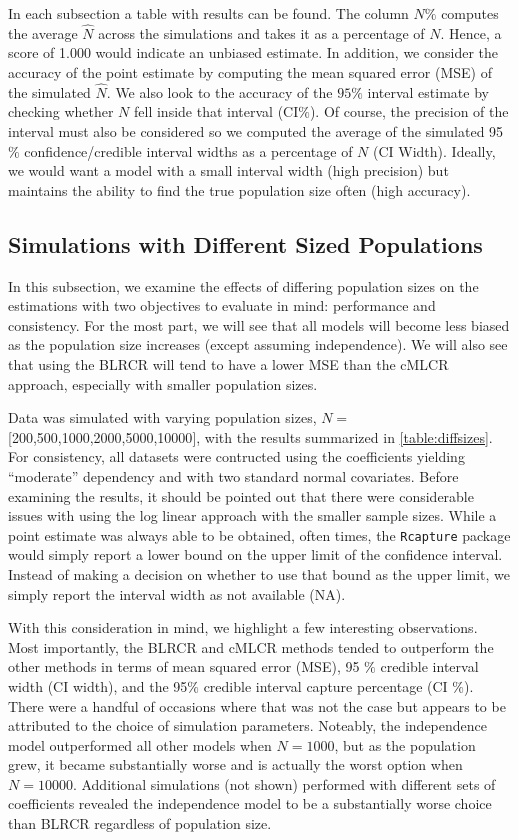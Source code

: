 \documentclass[
  12pt,
]{article}
\begin{document}
In each subsection a table with results can be found. The column \(N\%\)
computes the average \(\hat{N}\) across the simulations and takes it as
a percentage of \(N\). Hence, a score of 1.000 would indicate an
unbiased estimate. In addition, we consider the accuracy of the point
estimate by computing the mean squared error (MSE) of the simulated
\(\hat{N}\). We also look to the accuracy of the \(95\%\) interval
estimate by checking whether \(N\) fell inside that interval (CI\(\%\)).
Of course, the precision of the interval must also be considered so we
computed the average of the simulated 95\(\%\) confidence/credible
interval widths as a percentage of \(N\) (CI Width). Ideally, we would
want a model with a small interval width (high precision) but maintains
the ability to find the true population size often (high accuracy).

\subsection{Simulations with Different Sized Populations}
\label{Sec:simspopsize}

In this subsection, we examine the effects of differing population sizes
on the estimations with two objectives to evaluate in mind: performance
and consistency. For the most part, we will see that all models will
become less biased as the population size increases (except assuming
independence). We will also see that using the BLRCR will tend to have a
lower MSE than the cMLCR approach, especially with smaller population
sizes.

Data was simulated with varying population sizes,
\(N=\){[}200,500,1000,2000,5000,10000{]}, with the results summarized in
\autoref{table:diffsizes}. For consistency, all datasets were contructed
using the coefficients yielding ``moderate'' dependency and with two
standard normal covariates. Before examining the results, it should be
pointed out that there were considerable issues with using the log
linear approach with the smaller sample sizes. While a point estimate
was always able to be obtained, often times, the \texttt{Rcapture}
package would simply report a lower bound on the upper limit of the
confidence interval. Instead of making a decision on whether to use that
bound as the upper limit, we simply report the interval width as not
available (NA).

With this consideration in mind, we highlight a few interesting
observations. Most importantly, the BLRCR and cMLCR methods tended to
outperform the other methods in terms of mean squared error (MSE), 95
\(\%\) credible interval width (CI width), and the 95\(\%\) credible
interval capture percentage (CI \(\%\)). There were a handful of
occasions where that was not the case but appears to be attributed to
the choice of simulation parameters. Noteably, the independence model
outperformed all other models when \(N=1000\), but as the population
grew, it became substantially worse and is actually the worst option
when \(N=10000\). Additional simulations (not shown) performed with
different sets of coefficients revealed the independence model to be a
substantially worse choice than BLRCR regardless of population size.
\end{document}

